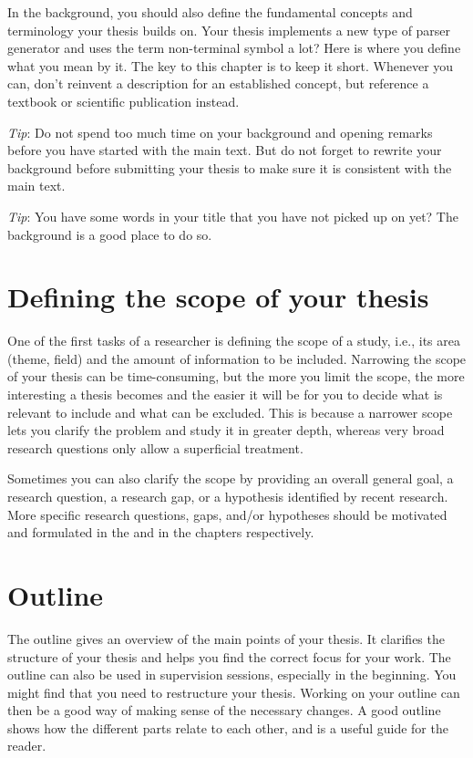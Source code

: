 \documentclass[a4paper,twoside]{bth}
\begin{document}
In the background, you should also define the fundamental concepts and terminology your thesis builds on. Your thesis implements a new type of parser generator and uses the term non-terminal symbol a lot? Here is where you define what you mean by it. The key to this chapter is to keep it short. Whenever you can, don't reinvent a description for an established concept, but reference a textbook or scientific publication instead.
    
\emph{Tip}: Do not spend too much time on your background and opening remarks before you have started with the main text. But do not forget to rewrite your background before submitting your thesis to make sure it is consistent with the main text.

\emph{Tip}: You have some words in your title that you have not picked up on yet? The background is a good place to do so.


\section{Defining the scope of your thesis}
One of the first tasks of a researcher is defining the scope of a study, i.e., its area (theme, field) and the amount of information to be included. Narrowing the scope of your thesis can be time-consuming, but the more you limit the scope, the more interesting a thesis becomes and the easier it will be for you to decide what is relevant to include and what can be excluded. This is because a narrower scope lets you clarify the problem and study it in greater depth, whereas very broad research questions only allow a superficial treatment.

Sometimes you can also clarify the scope by providing an overall general goal, a research question, a research gap, or a hypothesis identified by recent research. More specific research questions, gaps, and/or hypotheses should be motivated and formulated in the  and in the  chapters respectively.


\section{Outline}
The outline gives an overview of the main points of your thesis. It clarifies the structure of your thesis and helps you find the correct focus for your work. The outline can also be used in supervision sessions, especially in the beginning. You might find that you need to restructure your thesis. Working on your outline can then be a good way of making sense of the necessary changes. A good outline shows how the different parts relate to each other, and is a useful guide for the reader.
\end{document}
